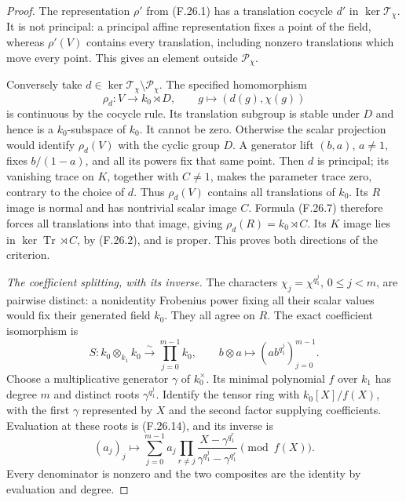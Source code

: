 \begin{proof}
The representation $\rho'$ from (F.26.1) has a
translation cocycle $d'$ in $\ker\mathscr T_\chi$.
It is not principal: a principal affine representation
fixes a point of the field, whereas $\rho'(V)$ contains
every translation, including nonzero translations
which move every point. This gives an element outside
$\mathscr P_\chi$.

Conversely take $d\in\ker\mathscr T_\chi
\setminus\mathscr P_\chi$. The specified homomorphism
\[
 \rho_d:V\longrightarrow k_0\rtimes D,\qquad
                        g\longmapsto(d(g),\chi(g))             \tag{F.26.13}
\]
is continuous by the cocycle rule. Its translation
subgroup is stable under $D$ and hence is a
$k_0$-subspace of $k_0$. It cannot be zero. Otherwise
the scalar projection would identify $\rho_d(V)$
with the cyclic group $D$. A generator lift $(b,a)$,
$a\ne1$, fixes $b/(1-a)$, and all its powers fix that
same point. Then $d$ is principal; its vanishing
trace on $K$, together with $C\ne1$, makes the
parameter trace zero, contrary to the choice of $d$.
Thus $\rho_d(V)$ contains all translations of $k_0$.
Its $R$ image is normal and has nontrivial scalar
image $C$. Formula (F.26.7) therefore forces all
translations into that image, giving
$\rho_d(R)=k_0\rtimes C$. Its $K$ image lies in
$\ker\operatorname{Tr}\rtimes C$, by (F.26.2), and
is proper. This proves both directions of the criterion.

\emph{The coefficient splitting, with its inverse.}
The characters $\chi_j=\chi^{q_1^j}$, $0\leq j<m$,
are pairwise distinct: a nonidentity Frobenius power
fixing all their scalar values would fix their
generated field $k_0$. They all agree on $R$.
The exact coefficient isomorphism is
\[
 S:k_0\otimes_{k_1}k_0\xrightarrow{\ \sim\ }\prod_{j=0}^{m-1}k_0,
             \qquad b\otimes a\longmapsto
                       (a b^{q_1^j})_{j=0}^{m-1}.              \tag{F.26.14}
\]
Choose a multiplicative generator $\gamma$ of $k_0^\times$.
Its minimal polynomial $f$ over $k_1$ has degree $m$
and distinct roots $\gamma^{q_1^j}$. Identify the
tensor ring with $k_0[X]/f(X)$, with the first
$\gamma$ represented by $X$ and the second factor
supplying coefficients. Evaluation at these roots
is (F.26.14), and its inverse is
\[
 (a_j)_j\longmapsto
 \sum_{j=0}^{m-1} a_j
   \prod_{r\ne j}
     \frac{X-\gamma^{q_1^r}}{\gamma^{q_1^j}-\gamma^{q_1^r}}
                      \pmod{f(X)}.                            \tag{F.26.15}
\]
Every denominator is nonzero and the two composites
are the identity by evaluation and degree.


\end{proof}
